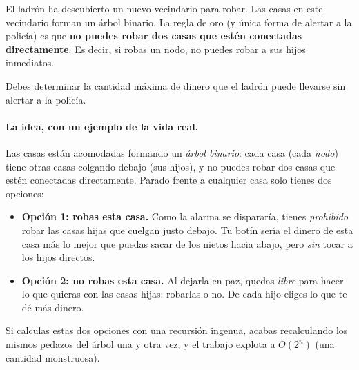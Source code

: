 
El ladrón ha descubierto un nuevo vecindario para robar. Las casas en este
vecindario forman un árbol binario. La regla de oro (y única forma de alertar a
la policía) es que \textbf{no puedes robar dos casas que estén conectadas
directamente}. Es decir, si robas un nodo, no puedes robar a sus hijos
inmediatos.

Debes determinar la cantidad máxima de dinero que el ladrón puede llevarse sin
alertar a la policía.

\paragraph{La idea, con un ejemplo de la vida real.} Las casas están acomodadas
formando un \emph{árbol binario}: cada casa (cada \emph{nodo}) tiene otras casas
colgando debajo (sus hijos), y no puedes robar dos casas que estén conectadas
directamente. Parado frente a cualquier casa solo tienes dos opciones:
\begin{itemize}
    \item \textbf{Opción 1: robas esta casa.} Como la alarma se dispararía,
    tienes \emph{prohibido} robar las casas hijas que cuelgan justo debajo. Tu
    botín sería el dinero de esta casa más lo mejor que puedas sacar de los
    nietos hacia abajo, pero \emph{sin} tocar a los hijos directos.
    \item \textbf{Opción 2: no robas esta casa.} Al dejarla en paz, quedas
    \emph{libre} para hacer lo que quieras con las casas hijas: robarlas o no.
    De cada hijo eliges lo que te dé más dinero.
\end{itemize}

Si calculas estas dos opciones con una recursión ingenua, acabas recalculando
los mismos pedazos del árbol una y otra vez, y el trabajo explota a $O(2^n)$
(una cantidad monstruosa).

